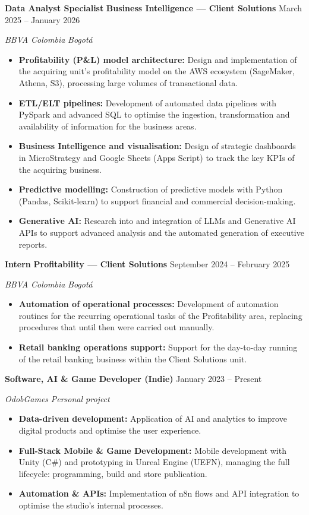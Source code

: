 \documentclass[letterpaper,10pt]{article}
\newcommand{\sizeTitle}  {\fontsize{10.6}{12.7}\selectfont}
\newcommand{\sizeContact}{\fontsize{9}{11}\selectfont}
\newcommand{\sizeWhere}  {\fontsize{9.5}{11.4}\selectfont}
\newcommand{\md}{\,\textperiodcentered\,}                  %
\newcommand{\cvrole}[2]{%
  \needspace{3\baselineskip}%
  {\color{cvdark}\sizeTitle\bfseries #1}%
  \hfill{\color{cvgray}\sizeContact #2}\par
  \vspace{1pt}%
}
\newcommand{\cvwhere}[1]{%
  {\color{cvgray}\sizeWhere\itshape #1}\par
  \vspace{3pt}%
}
\begin{document}
\cvrole{Data Analyst Specialist\md Business Intelligence --- Client Solutions}{March 2025 -- January 2026}
\cvwhere{BBVA Colombia\md Bogotá}
\begin{itemize}
  \item \textbf{Profitability (P\&L) model architecture:} Design and
        implementation of the acquiring unit's profitability model on the AWS
        ecosystem (SageMaker, Athena, S3), processing large volumes of
        transactional data.
  \item \textbf{ETL/ELT pipelines:} Development of automated data pipelines with
        PySpark and advanced SQL to optimise the ingestion, transformation and
        availability of information for the business areas.
  \item \textbf{Business Intelligence and visualisation:} Design of strategic
        dashboards in MicroStrategy and Google Sheets (Apps Script) to track the
        key KPIs of the acquiring business.
  \item \textbf{Predictive modelling:} Construction of predictive models with
        Python (Pandas, Scikit-learn) to support financial and commercial
        decision-making.
  \item \textbf{Generative AI:} Research into and integration of LLMs and
        Generative AI APIs to support advanced analysis and the automated
        generation of executive reports.
\end{itemize}
\vspace{7pt}

\cvrole{Intern\md Profitability --- Client Solutions}{September 2024 -- February 2025}
\cvwhere{BBVA Colombia\md Bogotá}
\begin{itemize}
  \item \textbf{Automation of operational processes:} Development of automation
        routines for the recurring operational tasks of the Profitability area,
        replacing procedures that until then were carried out manually.
  \item \textbf{Retail banking operations support:} Support for the day-to-day
        running of the retail banking business within the Client Solutions unit.
\end{itemize}
\vspace{7pt}

\cvrole{Software, AI \& Game Developer (Indie)}{January 2023 -- Present}
\cvwhere{OdobGames\md Personal project}
\begin{itemize}
  \item \textbf{Data-driven development:} Application of AI and analytics to
        improve digital products and optimise the user experience.
  \item \textbf{Full-Stack Mobile \& Game Development:} Mobile development with
        Unity (C\#) and prototyping in Unreal Engine (UEFN), managing the full
        lifecycle: programming, build and store publication.
  \item \textbf{Automation \& APIs:} Implementation of n8n flows and API
        integration to optimise the studio's internal processes.
\end{itemize}
\end{document}
